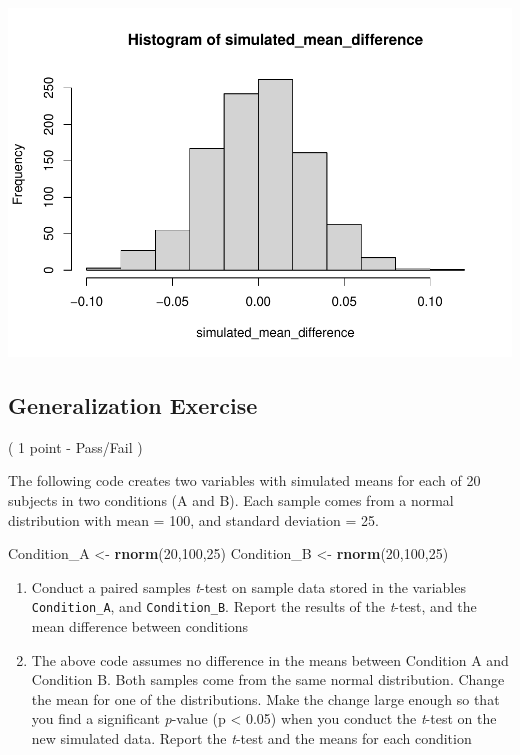 \documentclass[
]{book}
\newenvironment{Shaded}{\begin{snugshade}}{\end{snugshade}}
\newcommand{\DecValTok}[1]{\textcolor[rgb]{0.00,0.00,0.81}{#1}}
\newcommand{\FunctionTok}[1]{\textcolor[rgb]{0.13,0.29,0.53}{\textbf{#1}}}
\newcommand{\NormalTok}[1]{#1}
\newcommand{\OtherTok}[1]{\textcolor[rgb]{0.56,0.35,0.01}{#1}}
\begin{document}
\includegraphics{Statistics_Lab_files/figure-latex/unnamed-chunk-183-1.pdf}

\hypertarget{generalization-exercise-2}{%
\subsection{Generalization Exercise}\label{generalization-exercise-2}}

( 1 point - Pass/Fail )

The following code creates two variables with simulated means for each of 20 subjects in two conditions (A and B). Each sample comes from a normal distribution with mean = 100, and standard deviation = 25.

\begin{Shaded}
\begin{Highlighting}[]
\NormalTok{Condition\_A }\OtherTok{\textless{}{-}} \FunctionTok{rnorm}\NormalTok{(}\DecValTok{20}\NormalTok{,}\DecValTok{100}\NormalTok{,}\DecValTok{25}\NormalTok{)}
\NormalTok{Condition\_B }\OtherTok{\textless{}{-}} \FunctionTok{rnorm}\NormalTok{(}\DecValTok{20}\NormalTok{,}\DecValTok{100}\NormalTok{,}\DecValTok{25}\NormalTok{)}
\end{Highlighting}
\end{Shaded}

\begin{enumerate}
\def\labelenumi{\arabic{enumi}.}
\item
  Conduct a paired samples \emph{t}-test on sample data stored in the variables \texttt{Condition\_A}, and \texttt{Condition\_B}. Report the results of the \emph{t}-test, and the mean difference between conditions
\item
  The above code assumes no difference in the means between Condition A and Condition B. Both samples come from the same normal distribution. Change the mean for one of the distributions. Make the change large enough so that you find a significant \emph{p}-value (p \textless{} 0.05) when you conduct the \emph{t}-test on the new simulated data. Report the \emph{t}-test and the means for each condition
\end{enumerate}
\end{document}
